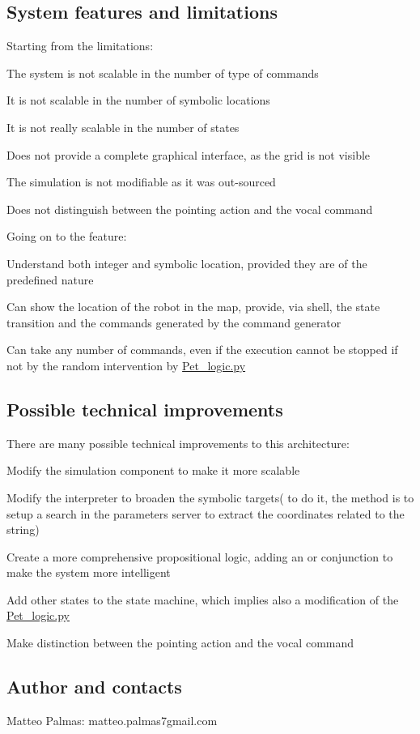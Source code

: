 \subsection*{System features and limitations}

Starting from the limitations\+:
\begin{DoxyItemize}
\item The system is not scalable in the number of type of commands
\item It is not scalable in the number of symbolic locations
\item It is not really scalable in the number of states
\item Does not provide a complete graphical interface, as the grid is not visible
\item The simulation is not modifiable as it was out-\/sourced
\item Does not distinguish between the pointing action and the vocal command
\end{DoxyItemize}

Going on to the feature\+:
\begin{DoxyItemize}
\item Understand both integer and symbolic location, provided they are of the predefined nature
\item Can show the location of the robot in the map, provide, via shell, the state transition and the commands generated by the command generator
\item Can take any number of commands, even if the execution cannot be stopped if not by the random intervention by \hyperlink{Pet__logic_8py}{Pet\+\_\+logic.\+py}
\end{DoxyItemize}

\subsection*{Possible technical improvements}

There are many possible technical improvements to this architecture\+:
\begin{DoxyItemize}
\item Modify the simulation component to make it more scalable
\item Modify the interpreter to broaden the symbolic targets( to do it, the method is to setup a search in the parameters server to extract the coordinates related to the string)
\item Create a more comprehensive propositional logic, adding an \textquotesingle{}or\textquotesingle{} conjunction to make the system more intelligent
\item Add other states to the state machine, which implies also a modification of the \hyperlink{Pet__logic_8py}{Pet\+\_\+logic.\+py}
\item Make distinction between the pointing action and the vocal command
\end{DoxyItemize}

\subsection*{Author and contacts}

Matteo Palmas\+: matteo.\+palmas7gmail.\+com 